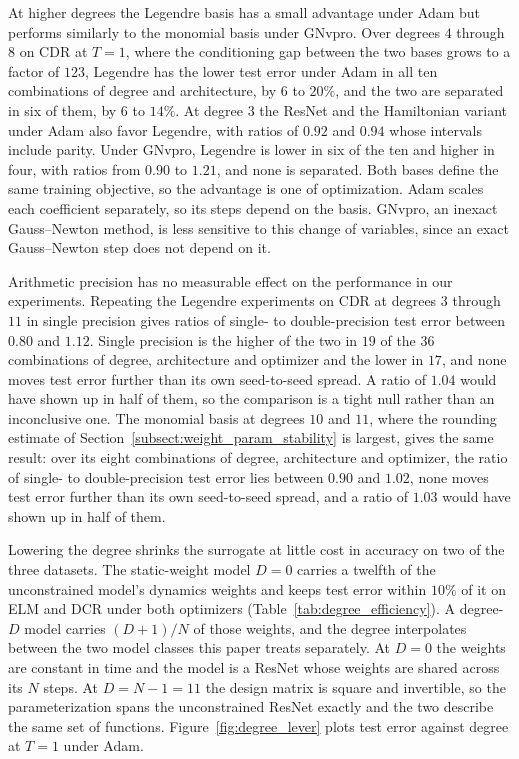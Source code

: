 \documentclass[pdflatex,sn-mathphys-num]{sn-jnl}%
\theoremstyle{thmstyleone}%
\theoremstyle{thmstyletwo}%
\theoremstyle{thmstylethree}%
\begin{document}
At higher degrees the Legendre basis has a small advantage under Adam but performs similarly to the monomial basis under GNvpro.
Over degrees $4$ through $8$ on CDR at $T=1$, where the conditioning gap between the two bases grows to a factor of $123$, Legendre has the lower test error under Adam in all ten combinations of degree and architecture, by $6$ to $20\%$, and the two are separated in six of them, by $6$ to $14\%$. At degree $3$ the ResNet and the Hamiltonian variant under Adam also favor Legendre, with ratios of $0.92$ and $0.94$ whose intervals include parity. Under GNvpro, Legendre is lower in six of the ten and higher in four, with ratios from $0.90$ to $1.21$, and none is separated.
%
Both bases define the same training objective, so the advantage is one of optimization. Adam scales each coefficient separately, so its steps depend on the basis. GNvpro, an inexact Gauss--Newton method, is less sensitive to this change of variables, since an exact Gauss--Newton step does not depend on it.

Arithmetic precision has no measurable effect on the performance in our experiments.
Repeating the Legendre experiments on CDR at degrees $3$ through $11$ in single precision gives ratios of single- to double-precision test error between $0.80$ and $1.12$. Single precision is the higher of the two in $19$ of the $36$ combinations of degree, architecture and optimizer and the lower in $17$, and none moves test error further than its own seed-to-seed spread. A ratio of $1.04$ would have shown up in half of them, so the comparison is a tight null rather than an inconclusive one. The monomial basis at degrees $10$ and $11$, where the rounding estimate of Section~\ref{subsect:weight_param_stability} is largest, gives the same result: over its eight combinations of degree, architecture and optimizer, the ratio of single- to double-precision test error lies between $0.90$ and $1.02$, none moves test error further than its own seed-to-seed spread, and a ratio of $1.03$ would have shown up in half of them.

Lowering the degree shrinks the surrogate at little cost in accuracy on two of the three datasets. The static-weight model $D=0$ carries a twelfth of the unconstrained model's dynamics weights and keeps test error within $10\%$ of it on ELM and DCR under both optimizers (Table~\ref{tab:degree_efficiency}).
%
A degree-$D$ model carries $(D+1)/N$ of those weights, and the degree interpolates between the two model classes this paper treats separately.
%
At $D=0$ the weights are constant in time and the model is a ResNet whose weights are shared across its $N$ steps. At $D=N-1=11$ the design matrix is square and invertible, so the parameterization spans the unconstrained ResNet exactly and the two describe the same set of functions.
%
Figure~\ref{fig:degree_lever} plots test error against degree at $T=1$ under Adam.
\end{document}
